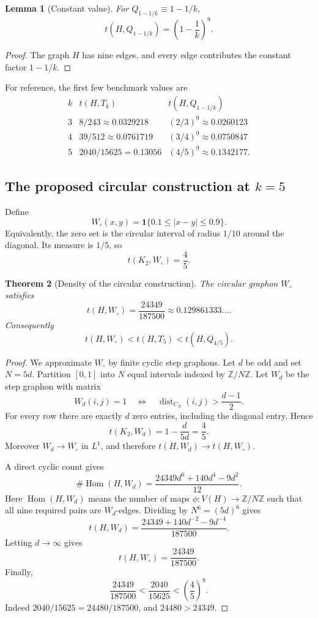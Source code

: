 \documentclass[11pt]{amsart}
\newtheorem{theorem}{Theorem}[section]
\newtheorem{lemma}[theorem]{Lemma}
\theoremstyle{definition}
\newcommand{\1}{\mathbf 1}
\newcommand{\Z}{\mathbb Z}
\newcommand{\dist}{\operatorname{dist}}
\newcommand{\Hom}{\operatorname{Hom}}
\begin{document}
\begin{lemma}[Constant value]
For $Q_{1-1/k}\equiv 1-1/k$,
\[
   t(H,Q_{1-1/k})=\left(1-\frac1k\right)^9.
\]
\end{lemma}

\begin{proof}
The graph $H$ has nine edges, and every edge contributes the constant factor $1-1/k$.
\end{proof}

For reference, the first few benchmark values are
\[
\begin{array}{c|c|c}
 k & t(H,T_k) & t(H,Q_{1-1/k})\\ \hline
 3 & 8/243\approx 0.0329218 & (2/3)^9\approx 0.0260123\\
 4 & 39/512\approx 0.0761719 & (3/4)^9\approx 0.0750847\\
 5 & 2040/15625=0.13056 & (4/5)^9\approx 0.1342177.
\end{array}
\]

\subsection{The proposed circular construction at $k=5$}

Define
\[
   W_\circ(x,y)=\1\{0.1\le |x-y|\le 0.9\}.
\]
Equivalently, the zero set is the circular interval of radius $1/10$ around the diagonal.  Its measure is $1/5$, so
\[
   t(K_2,W_\circ)=\frac45.
\]

\begin{theorem}[Density of the circular construction]
The circular graphon $W_\circ$ satisfies
\[
   t(H,W_\circ)=\frac{24349}{187500}\approx 0.129861333\ldots .
\]
Consequently
\[
   t(H,W_\circ)<t(H,T_5)<t(H,Q_{4/5}).
\]
\end{theorem}

\begin{proof}
We approximate $W_\circ$ by finite cyclic step graphons.  Let $d$ be odd and set $N=5d$.  Partition $[0,1]$ into $N$ equal intervals indexed by $\Z/N\Z$.  Let $W_d$ be the step graphon with matrix
\[
   W_d(i,j)=1\quad\Longleftrightarrow\quad
   \dist_{C_N}(i,j)>\frac{d-1}{2}.
\]
For every row there are exactly $d$ zero entries, including the diagonal entry.  Hence
\[
   t(K_2,W_d)=1-\frac{d}{5d}=\frac45.
\]
Moreover $W_d\to W_\circ$ in $L^1$, and therefore $t(H,W_d)\to t(H,W_\circ)$.

A direct cyclic count gives
\[
   \#\Hom(H,W_d)=\frac{24349d^6+140d^4-9d^2}{12}.
\]
Here $\Hom(H,W_d)$ means the number of maps $\phi:V(H)\to\Z/N\Z$ such that all nine required pairs are $W_d$-edges.  Dividing by $N^6=(5d)^6$ gives
\[
   t(H,W_d)=\frac{24349+140d^{-2}-9d^{-4}}{187500}.
\]
Letting $d\to\infty$ gives
\[
   t(H,W_\circ)=\frac{24349}{187500}.
\]
Finally,
\[
   \frac{24349}{187500}<\frac{2040}{15625}<\left(\frac45\right)^9.
\]
Indeed $2040/15625=24480/187500$, and $24480>24349$.
\end{proof}
\end{document}
